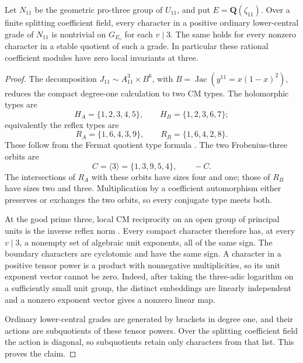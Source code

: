 \begin{lemma}
\label{lem:eleven-coefficient-local-nontriviality}
Let \(N_{11}\) be the geometric pro-three group of \(U_{11}\),
and put \(E=\mathbf Q(\zeta_{11})\). Over a finite splitting
coefficient field, every character in a positive ordinary
lower-central grade of \(N_{11}\) is nontrivial on
\(G_{E_v}\) for each \(v\mid3\). The same holds for every
nonzero character in a stable quotient of such a grade.
In particular these rational coefficient modules have zero
local invariants at three.
\end{lemma}
\begin{proof}
The decomposition \(J_{11}\sim A_{11}^3\times B^6\), with
\(B=\operatorname{Jac}(y^{11}=x(1-x)^2)\), reduces the
compact degree-one calculation to two CM types. The
holomorphic types are
\[
 H_A=\{1,2,3,4,5\},\qquad H_B=\{1,2,3,6,7\};
\]
equivalently the reflex types are
\[
 R_A=\{1,6,4,3,9\},\qquad R_B=\{1,6,4,2,8\}.
\]
These follow from the Fermat quotient type formula
\citep[\S2.1, author p.~5]{ShuExpanded2021}.
The two Frobenius-three orbits are
\[
 C=\langle3\rangle=\{1,3,9,5,4\},\qquad -C.
\]
The intersections of \(R_A\) with these orbits have sizes
four and one; those of \(R_B\) have sizes two and three.
Multiplication by a coefficient automorphism either preserves
or exchanges the two orbits, so every conjugate type meets
both.

At the good prime three, local CM reciprocity on an open
group of principal units is the inverse reflex norm
\citep[Theorem~5.1, pp.~483--484]{Lombardo2017}.
Every compact character therefore has, at every \(v\mid3\),
a nonempty set of algebraic unit exponents, all of the same
sign. The boundary characters are cyclotomic and have the
same sign. A character in a positive tensor power is a
product with nonnegative multiplicities, so its unit exponent
vector cannot be zero. Indeed, after taking the three-adic
logarithm on a sufficiently small unit group, the distinct
embeddings are linearly independent and a nonzero exponent
vector gives a nonzero linear map.

Ordinary lower-central grades are generated by brackets in
degree one, and their actions are subquotients of these tensor
powers. Over the splitting coefficient field the action is
diagonal, so subquotients retain only characters from that
list. This proves the claim.
\end{proof}


